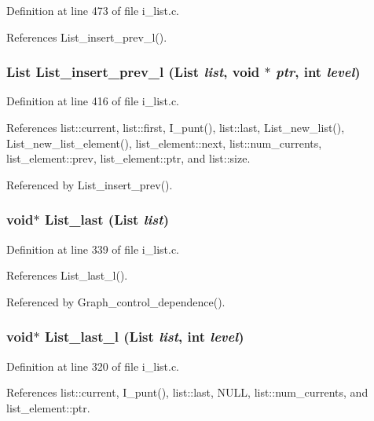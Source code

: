 Definition at line 473 of file i\_\-list.c.

References List\_\-insert\_\-prev\_\-l().
\subsubsection{\setlength{\rightskip}{0pt plus 5cm}\bf{List} List\_\-insert\_\-prev\_\-l (\bf{List} {\em list}, void $\ast$ {\em ptr}, int {\em level})}\label{i__list_8c_e649a7989eae772ed2793b561b0fa937}




Definition at line 416 of file i\_\-list.c.

References list::current, list::first, I\_\-punt(), list::last, List\_\-new\_\-list(), List\_\-new\_\-list\_\-element(), list\_\-element::next, list::num\_\-currents, list\_\-element::prev, list\_\-element::ptr, and list::size.

Referenced by List\_\-insert\_\-prev().
\subsubsection{\setlength{\rightskip}{0pt plus 5cm}void$\ast$ List\_\-last (\bf{List} {\em list})}\label{i__list_8c_e3a111d9146a0c4bbf2efa8948cf13ee}




Definition at line 339 of file i\_\-list.c.

References List\_\-last\_\-l().

Referenced by Graph\_\-control\_\-dependence().
\subsubsection{\setlength{\rightskip}{0pt plus 5cm}void$\ast$ List\_\-last\_\-l (\bf{List} {\em list}, int {\em level})}\label{i__list_8c_52b36d070b2e10a259aea2cbfdf4d1e9}




Definition at line 320 of file i\_\-list.c.

References list::current, I\_\-punt(), list::last, NULL, list::num\_\-currents, and list\_\-element::ptr.

